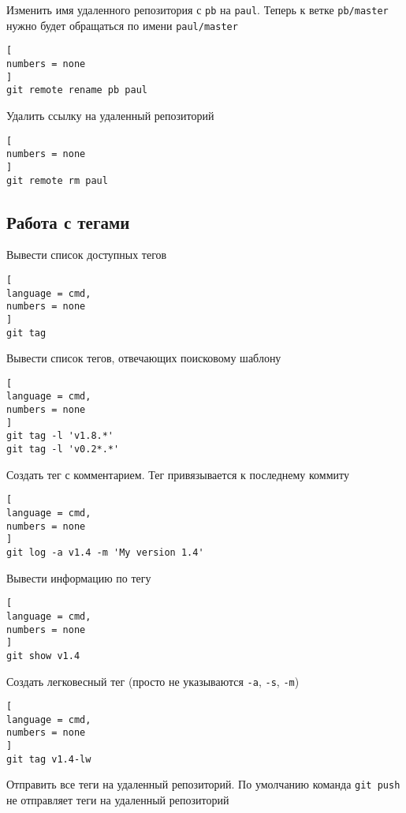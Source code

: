 \documentclass[%
	11pt,
	a4paper,
	utf8,
		]{article}
\begin{document}
Изменить имя удаленного репозитория с \texttt{pb} на \texttt{paul}. Теперь к ветке \texttt{pb/master} нужно будет обращаться по имени \texttt{paul/master}

\begin{lstlisting}[
numbers = none
]
git remote rename pb paul
\end{lstlisting}


Удалить ссылку на удаленный репозиторий

\begin{lstlisting}[
numbers = none
]
git remote rm paul
\end{lstlisting}


\subsection{Работа с тегами}

Вывести список доступных тегов

\begin{lstlisting}[
language = cmd,
numbers = none
]
git tag
\end{lstlisting}


Вывести список тегов, отвечающих поисковому  шаблону

\begin{lstlisting}[
language = cmd,
numbers = none
]
git tag -l 'v1.8.*'
git tag -l 'v0.2*.*'
\end{lstlisting}


Создать тег с комментарием. Тег привязывается к последнему коммиту

\begin{lstlisting}[
language = cmd,
numbers = none
]
git log -a v1.4 -m 'My version 1.4'
\end{lstlisting}

Вывести информацию по тегу

\begin{lstlisting}[
language = cmd,
numbers = none
]
git show v1.4
\end{lstlisting}


Создать легковесный тег (просто не указываются \texttt{-a}, \texttt{-s}, \texttt{-m})

\begin{lstlisting}[
language = cmd,
numbers = none
]
git tag v1.4-lw
\end{lstlisting}


Отправить все теги на удаленный репозиторий. По умолчанию команда \texttt{git push} не отправляет теги на удаленный репозиторий
\end{document}
